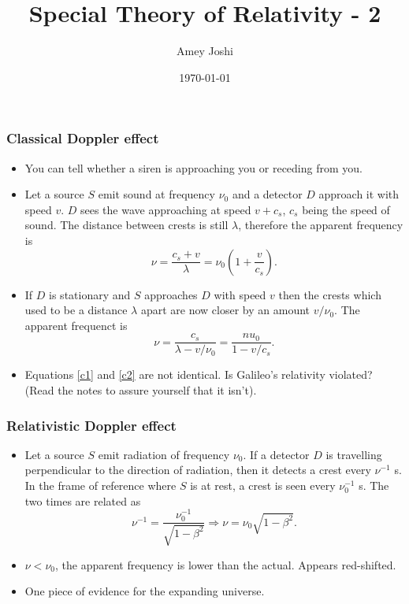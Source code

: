 \documentclass{beamer}
\title{Special Theory of Relativity - 2}
\author{Amey Joshi}
\date{\today}
\begin{document}
\begin{frame}
\titlepage
\end{frame}

\begin{frame}
\frametitle{Classical Doppler effect}
\begin{itemize}
\item You can tell whether a siren is approaching you or receding from you.
\item Let a source $S$ emit sound at frequency $\nu_0$ and a detector $D$ 
approach it with speed $v$. $D$ sees the wave approaching at speed $v+c_s$, 
$c_s$ being the speed of sound. The distance between crests is still $\lambda$,
therefore the apparent frequency is
\begin{equation}\label{c1}
\nu = \frac{c_s+v}{\lambda} = \nu_0\left(1 + \frac{v}{c_s}\right).
\end{equation}
\item If $D$ is stationary and $S$ approaches $D$ with speed $v$ then the
crests which used to be a distance $\lambda$ apart are now closer by an amount
$v/\nu_0$. The apparent frequenct is
\begin{equation}\label{c2}
\nu = \frac{c_s}{\lambda - v/\nu_0} = \frac{nu_0}{1 - v/c_s}.
\end{equation}
\item Equations \eqref{c1} and \eqref{c2} are not identical. Is Galileo's 
relativity violated? (Read the notes to assure yourself that it isn't).
\end{itemize}
\end{frame}

\begin{frame}
\frametitle{Relativistic Doppler effect}
\begin{itemize}
\item Let a source $S$ emit radiation of frequency $\nu_0$. If a detector $D$
is travelling perpendicular to the direction of radiation, then it detects a 
crest every $\nu^{-1}$ s. In the frame of reference where $S$ is at rest, a 
crest is seen every $\nu_0^{-1}$ s. The two times are related as
\begin{equation}\label{e3}
\nu^{-1} = \frac{\nu_0^{-1}}{\sqrt{1 - \beta^2}} \Rightarrow
\nu = \nu_0\sqrt{1 - \beta^2}.
\end{equation}
\item $\nu < \nu_0$, the apparent frequency is lower than the actual. Appears
red-shifted.
\item One piece of evidence for the expanding universe.
\end{itemize}
\end{frame}
\end{document}
